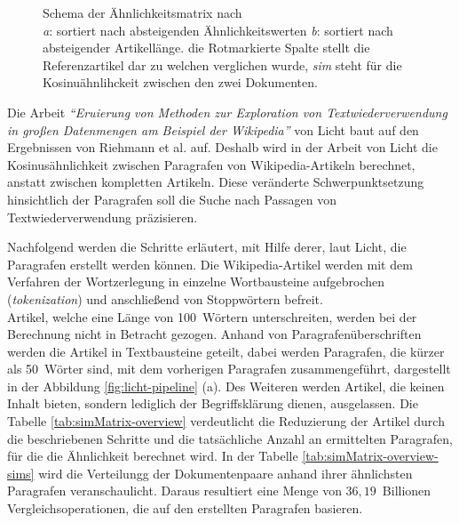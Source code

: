 \begin{figure}[H]
    \caption{Schema der Ähnlichkeitsmatrix nach \cite{riehmann2016visualizing}\\\emph{a}: sortiert nach absteigenden Ähnlichkeitswerten \emph{b}: sortiert nach absteigender Artikellänge. die Rotmarkierte Spalte stellt die Referenzartikel dar zu welchen verglichen wurde, \emph{sim} steht für die Kosinuähnlihckeit zwischen den zwei Dokumenten.}
    \label{fig:simmatrix-1}
\end{figure}

Die Arbeit \emph{"`Eruierung von Methoden zur Exploration von Textwiederverwendung in großen Datenmengen am Beispiel der Wikipedia"'} von Licht \cite{licht:2017} baut auf den Ergebnissen von Riehmann et al. \cite{riehmann2016visualizing} auf.
Deshalb wird in der Arbeit von Licht die Kosinusähnlichkeit zwischen Paragrafen von Wikipedia-Artikeln berechnet, anstatt zwischen kompletten Artikeln.
Diese veränderte Schwerpunktsetzung hinsichtlich der Paragrafen soll die Suche nach Passagen von Textwiederverwendung präzisieren.


Nachfolgend werden die Schritte erläutert, mit Hilfe derer, laut Licht, die Paragrafen erstellt werden können.
Die Wikipedia-Artikel werden mit dem Verfahren der Wortzerlegung in einzelne Wortbausteine aufgebrochen (\emph{tokenization}) und anschließend von Stoppwörtern befreit.\\
Artikel, welche eine Länge von 100~Wörtern unterschreiten, werden bei der Berechnung nicht in Betracht gezogen.
Anhand von Paragrafenüberschriften werden die Artikel in Textbausteine geteilt, dabei werden Paragrafen, die kürzer als 50~Wörter sind, mit dem vorherigen Paragrafen zusammengeführt, dargestellt in der Abbildung \ref{fig:licht-pipeline} (a).
Des Weiteren werden Artikel, die keinen Inhalt bieten, sondern lediglich der Begriffsklärung dienen, ausgelassen.
Die Tabelle \ref{tab:simMatrix-overview} verdeutlicht die Reduzierung der Artikel durch die beschriebenen Schritte und die tatsächliche Anzahl an ermittelten Paragrafen, für die die Ähnlichkeit berechnet wird.
In der Tabelle \ref{tab:simMatrix-overview-sims} wird die Verteilungg der Dokumentenpaare anhand ihrer ähnlichsten Paragrafen veranschaulicht.
Daraus resultiert eine Menge von $36,19$~Billionen Vergleichsoperationen, die auf den erstellten Paragrafen basieren.

